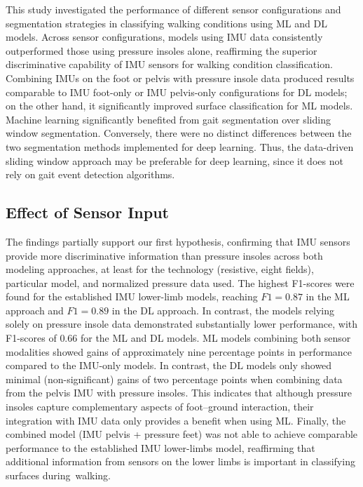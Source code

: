 \documentclass[sensors,article,accept,pdftex,moreauthors]{Definitions/mdpi}
\begin{document}
This study investigated the performance of different sensor configurations and segmentation strategies in classifying walking conditions using ML and DL models. Across sensor configurations, models using IMU data consistently outperformed those using pressure insoles alone, reaffirming the superior discriminative capability of IMU sensors for walking condition classification. Combining IMUs \textcolor{revision}{on the foot} {or pelvis} with pressure insole data produced results comparable to \textcolor{revision}{IMU foot{-only or IMU pelvis}}-only configurations for DL \textcolor{revision}{models}; on the other hand, \textcolor{revision}{it significantly improved surface classification for ML models}. Machine learning significantly benefited from gait segmentation over sliding window segmentation. Conversely, there were no distinct differences between the two segmentation methods implemented \textcolor{revision}{for deep learning. Thus, the data-driven sliding window approach may be preferable \textcolor{revision}{for deep learning}, since it does not rely on gait event detection algorithms. } 

\subsection{Effect of Sensor Input}
The findings partially support our first hypothesis, confirming that IMU sensors provide more discriminative information than pressure insoles across both modeling approaches, at least for the technology (resistive, eight fields), particular model, and \textcolor{revision}{normalized} pressure data used. The highest F1-scores \textcolor{revision}{were found for the established IMU lower-limb} models, reaching $F1=0.87$ in the ML approach and \textcolor{revision}{$F1=0.89$} in the DL approach. In contrast, the models relying solely on pressure insole data demonstrated substantially lower performance, with F1-scores of \textcolor{revision}{0.66} for the ML and {DL} models. ML models combining both sensor modalities showed gains of approximately \textcolor{revision}{nine percentage} points in performance \textcolor{revision}{compared to the IMU{-only models}}. \textcolor{revision}{In contrast, the DL models only showed minimal {(non-significant)} gains of two percentage points {when combining data from the pelvis IMU with pressure insoles.}} This indicates that although pressure insoles capture complementary aspects of foot--ground interaction, their integration with IMU data only provides a benefit \textcolor{revision}{when using ML. Finally, the combined model (IMU {pelvis} + pressure feet) was not able to achieve comparable performance to the established IMU lower-limbs model, reaffirming that additional information from sensors on the lower limbs is important in classifying surfaces \mbox{during walking.}}
\end{document}
